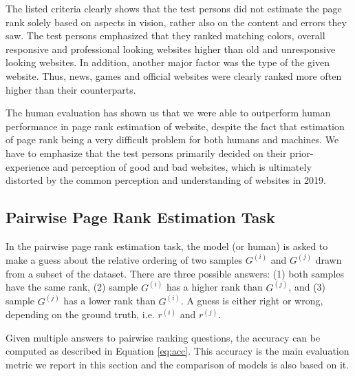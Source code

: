 The listed criteria clearly shows that the test persons did not estimate the page rank solely based on aspects in vision, rather also on the content and errors they saw. The test persons emphasized that they ranked matching colors, overall responsive and professional looking websites higher than old and unresponsive looking websites. In addition, another major factor was the type of the given website. Thus, news, games and official websites were clearly ranked more often higher than their counterparts.

The human evaluation has shown us that we were able to outperform human performance in page rank estimation of website, despite the fact that estimation of page rank being a very difficult problem for both humans and machines. We have to emphasize that the test persons primarily decided on their prior-experience and perception of good and bad websites, which is ultimately distorted by the common perception and understanding of websites in 2019.

\subsection{Pairwise Page Rank Estimation Task}

In the pairwise page rank estimation task, the model (or human) is asked to make a guess about the relative ordering of two samples $G^{(i)}$ and $G^{(j)}$ drawn from a subset of the dataset. There are three possible answers: (1) both samples have the same rank, (2) sample $G^{(i)}$ has a higher rank than $G^{(j)}$, and (3) sample $G^{(j)}$ has a lower rank than $G^{(i)}$. A guess is either right or wrong, depending on the ground truth, i.e. $r^{(i)}$ and $r^{(j)}$.

Given multiple answers to pairwise ranking questions, the accuracy can be computed as described in Equation \ref{eq:acc}. This accuracy is the main evaluation metric we report in this section and the comparison of models is also based on it.

